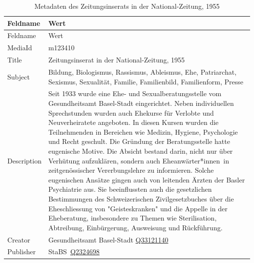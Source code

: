 \documentclass[
  letterpaper,
  DIV=11,
  numbers=noendperiod]{scrartcl}
\begin{document}
\begin{longtable}[]{@{}
  >{\raggedright\arraybackslash}p{}
  >{\raggedright\arraybackslash}p{}@{}}
\caption{Metadaten des Zeitungsinserats in der National-Zeitung,
1955}\label{tbl-metadaten-zeitungsinserat-in-der-national-zeitung-1955}\tabularnewline
\toprule\noalign{}
\begin{minipage}[b]{\linewidth}\raggedright
Feldname
\end{minipage} & \begin{minipage}[b]{\linewidth}\raggedright
Wert
\end{minipage} \\
\midrule\noalign{}
\endfirsthead
\toprule\noalign{}
\begin{minipage}[b]{\linewidth}\raggedright
Feldname
\end{minipage} & \begin{minipage}[b]{\linewidth}\raggedright
Wert
\end{minipage} \\
\midrule\noalign{}
\endhead
\bottomrule\noalign{}
\endlastfoot
MediaId & m123410 \\
Title & Zeitungsinserat in der National-Zeitung, 1955 \\
Subject & Bildung, Biologismus, Rassismus, Ableismus, Ehe, Patriarchat,
Sexismus, Sexualität, Familie, Familienbild, Familienform, Presse \\
Description & Seit 1933 wurde eine Ehe- und Sexualberatungsstelle vom
Gesundheitsamt Basel-Stadt eingerichtet. Neben individuellen
Sprechstunden wurden auch Ehekurse für Verlobte und Neuverheiratete
angeboten. In diesen Kursen wurden die Teilnehmenden in Bereichen wie
Medizin, Hygiene, Psychologie und Recht geschult. Die Gründung der
Beratungsstelle hatte eugenische Motive. Die Absicht bestand darin,
nicht nur über Verhütung aufzuklären, sondern auch Eheanwärter*innen~in
zeitgenössischer Vererbungslehre zu informieren. Solche eugenischen
Ansätze gingen auch von leitenden Ärzten der Basler Psychiatrie aus. Sie
beeinflussten auch die gesetzlichen Bestimmungen des Schweizerischen
Zivilgesetzbuches über die Eheschliessung von "Geisteskranken" und die
Appelle in der Eheberatung, insbesondere zu Themen wie Sterilisation,
Abtreibung, Einbürgerung, Ausweisung und Rückführung. \\
Creator & Gesundheitsamt Basel-Stadt
\href{https://www.wikidata.org/wiki/Q33121140}{Q33121140} \\
Publisher &
StaBS~\href{https://www.wikidata.org/wiki/Q2324698}{Q2324698} \\

\end{longtable}
\end{document}
